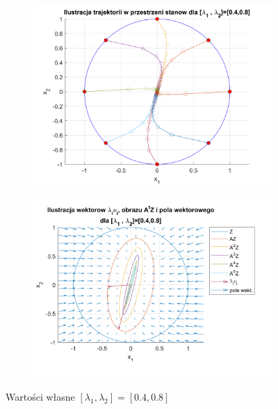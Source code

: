 \documentclass{article}
\begin{document}
\begin{figure}[H]
    \centering
    \begin{subfigure}{0.44\textwidth}
        \includegraphics[width=\textwidth]{portret_fazowy_4_8.png}
    \end{subfigure}
    \begin{subfigure}{0.48\textwidth}
        \includegraphics[width=\textwidth]{pole_wektorowe_4_8.png}
    \end{subfigure}
    \caption{Warto\'sci własne $[ \lambda_1, \lambda_2 ]= [ 0.4, 0.8 ]$}
    \label{fig::4i8}
\end{figure}
\end{document}
